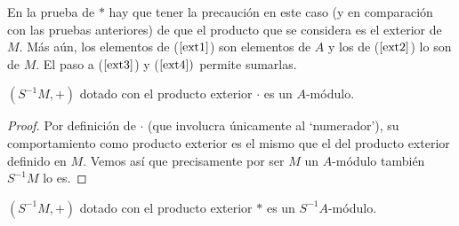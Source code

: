 \documentclass[../main.tex]{subfiles}
\begin{document}
\begin{remark}
\begin{remark}
	En la prueba de $*$ hay que tener la precaución en este caso (y en comparación con las pruebas anteriores) de que el producto que se considera es el exterior de $M$. Más aún, los elementos de ($\ref{ext1}$) son elementos de $A$ y los de ($\ref{ext2}$) lo son de $M$. El paso a ($\ref{ext3}$) y ($\ref{ext4})$ permite sumarlas.
\end{remark}

\begin{proposition}
	$(S^{-1}M,+)$ dotado con el producto exterior $·$ es un $A$-módulo.
\end{proposition}

\begin{proof}
	Por definición de $·$ (que involucra únicamente al `numerador'), su comportamiento como producto exterior es el mismo que el del producto exterior definido en $M$. Vemos así que precisamente por ser $M$ un $A$-módulo también $S^{-1}M$ lo es.
\end{proof}

\begin{proposition}
	$(S^{-1}M,+)$ dotado con el producto exterior $*$ es un $S^{-1}A$-módulo.
\end{proposition}


\end{remark}
\end{document}
